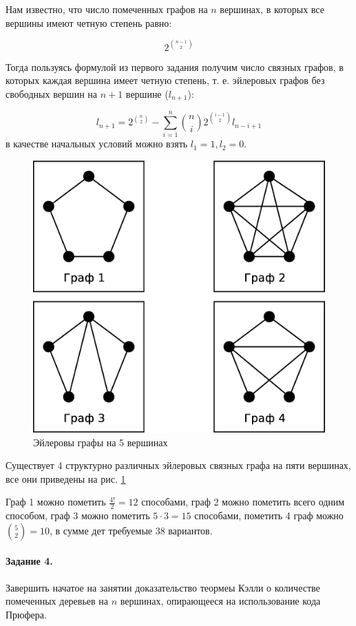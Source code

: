 \documentclass[a4paper,12pt]{article}
\begin{document}
\begin{Solution}
Нам известно, что число помеченных графов на $n$ вершинах, в которых все вершины имеют четную степень равно:

\[
	2^{\binom{n-1}{2}}
\]

Тогда пользуясь формулой из первого задания получим число связных графов, в которых каждая вершина имеет четную степень, т. е. эйлеровых графов без свободных вершин на $n+1$ вершине ($l_{n+1}$):

\[
	l_{n+1} = 2^{\binom{n}{2}} - \sum_{i=1}^{n} \binom{n}{i} 2^{\binom{i-1}{2}} l_{n-i+1}
\]
в качестве начальных условий можно взять $l_1 = 1, l_2 = 0$.

\begin{figure}[h]
\begin{center}
\noindent\includegraphics[width=0.4\linewidth]{graphs}
\caption{Эйлеровы графы на 5 вершинах}
\label{img::graphs}
\end{center}
\end{figure}

Существует 4 структурно различных эйлеровых связных графа на пяти вершинах, все они приведены на рис. \ref{img::graphs}

Граф 1 можно пометить $\frac{4!}{2} = 12$ способами, граф 2 можно пометить всего одним способом, граф 3 можно пометить $5 \cdot 3 = 15$ способами, пометить 4 граф можно $\binom{5}{2} = 10$, в сумме дет требуемые 38 вариантов.
\end{Solution}

\paragraph{Задание 4.} Завершить начатое на занятии доказательство теормеы Кэлли о количестве помеченных деревьев на $n$ вершинах, опирающееся на использование кода Прюфера.
\end{document}
